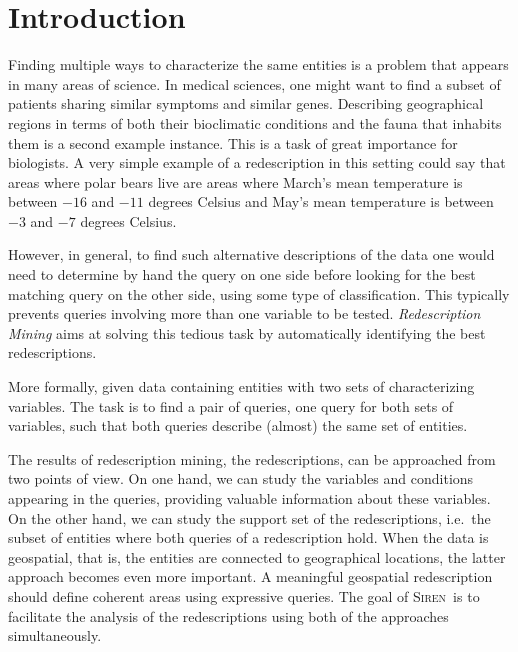 \documentclass{sig-alternate}
\newcommand{\note}[1]{{\color{red}#1}}
\newcommand{\Siren}{\textsc{Siren}}
\begin{document}


\section{Introduction}
Finding multiple ways to characterize the same entities is a problem
that appears in many areas of science.  In medical sciences, one might
want to find a subset of patients sharing similar symptoms and similar
genes. Describing geographical regions in terms of both their
bioclimatic conditions and the fauna that inhabits them is a second
example instance. This is a task of great importance for biologists.
 A very
simple example of a redescription in this setting could say that
areas where polar bears live are areas where March's mean temperature
is between $-16$ and $-11$ degrees Celsius and May's mean temperature
is between $-3$ and $-7$ degrees Celsius.

However, in general, to find such alternative descriptions of the data one would
need to determine by hand the query on one side before
looking for the best matching query on the other side, using some type
of classification. This typically prevents queries involving more than
one variable to be tested.  \emph{Redescription Mining} aims at
solving this tedious task by automatically identifying the best
redescriptions.

More formally, given data containing entities with two sets of characterizing
variables. The task is to find a pair of queries, one query for both
sets of variables, such that both queries describe (almost) the same
set of entities.

The results of redescription mining, the redescriptions, can be
approached from two points of view. On one hand, we can study the
variables and conditions appearing in the queries, providing
valuable information about these variables. On the other hand, we can
study the support set of the redescriptions, i.e.\ the subset of
entities where both queries of a redescription hold. When the data
is geospatial, that is, the entities are connected to geographical locations, the
latter approach becomes even more important. A meaningful geospatial
redescription should define coherent areas using expressive
queries. The goal of \Siren\ is to facilitate the analysis of the
redescriptions using both of the approaches simultaneously.
\end{document}
